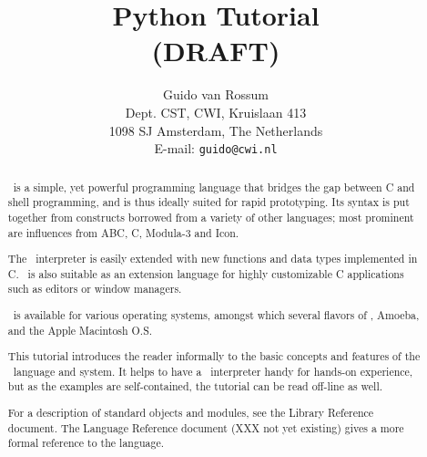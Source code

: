 

\title{\bf
	Python Tutorial \\
	(DRAFT)
}

\author{
	Guido van Rossum \\
	Dept. CST, CWI, Kruislaan 413 \\
	1098 SJ Amsterdam, The Netherlands \\
	E-mail: {\tt guido@cwi.nl}
}




\maketitle

\begin{abstract}

\noindent
\Python\ is a simple, yet powerful programming language that bridges the
gap between C and shell programming, and is thus ideally suited for rapid
prototyping.
Its syntax is put together from constructs borrowed from a variety of other
languages; most prominent are influences from ABC, C, Modula-3 and Icon.

The \Python\ interpreter is easily extended with new functions and data
types implemented in C.
\Python\ is also suitable as an extension language for highly
customizable C applications such as editors or window managers.

\Python\ is available for various operating systems, amongst which
several flavors of \UNIX, Amoeba, and the Apple Macintosh O.S.

This tutorial introduces the reader informally to the basic concepts and
features of the \Python\ language and system.
It helps to have a \Python\ interpreter handy for hands-on experience,
but as the examples are self-contained, the tutorial can be read
off-line as well.

For a description of standard objects and modules, see the Library
Reference document.
The Language Reference document (XXX not yet existing)
gives a more formal reference to the language.

\end{abstract}

\pagebreak

\tableofcontents

\pagebreak

